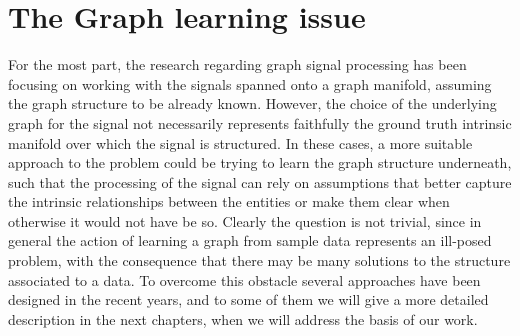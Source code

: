 \chapter{The Graph learning issue}
For the most part, the research regarding graph signal processing has been focusing on working with the signals spanned onto a graph manifold, assuming the graph structure to be already known. However, the choice of the underlying graph for the signal not necessarily represents faithfully the ground truth intrinsic manifold over which the signal is structured. In these cases, a more suitable approach to the problem could be trying to learn the graph structure underneath, such that the processing of the signal can rely on assumptions that better capture the intrinsic relationships between the entities or make them clear when otherwise it would not have be so. \cite{Maretic2017} Clearly the question is not trivial, since in general the action of learning a graph from sample data represents an ill-posed problem, with the consequence that there may be many solutions to the structure associated to a data. \cite{Dong2016} To overcome this obstacle several approaches have been designed in the recent years, and to some of them we will give a more detailed description in the next chapters, when we will address the basis of our work.
